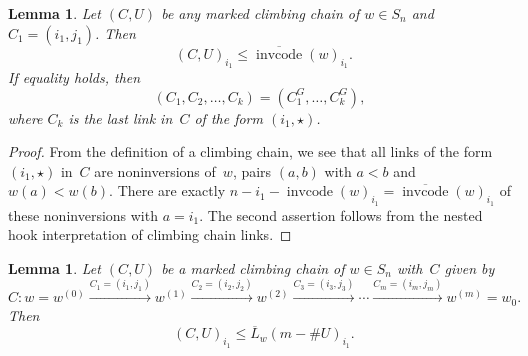 \documentclass[10pt,a4paper]{amsart}
\DeclareMathOperator{\dwt}{\overline{\mathrm{wt}}}
\DeclareMathOperator{\cc}{\mathrm{invcode}}
\newcommand{\occ}{\overline{\cc}}
\newcommand{\LL}{\overline{L}}
\newcommand{\CG}{C^G}
\newtheorem{lemma}[theorem]{Lemma}
\begin{document}
\setcounter{section}{11}\setcounter{theorem}{0}
\begin{lemma}
	\label{lem:maxmarkedones}
	Let $(C,U)$ be any marked climbing chain of $w\in S_n$ and $C_1=(i_1,j_1)$. Then 
	\[\dwt(C,U)_{i_1} \leq \occ(w)_{i_1}.\]
	If equality holds, then 
	\[(C_1,C_2,\ldots,C_k) = (\CG_1,\ldots,\CG_k), \]
	where $C_k$ is the last link in~$C$ of the form $(i_1,\star)$.
\end{lemma}

\begin{proof}
	From the definition of a climbing chain, we see that all links of the form $(i_1,\star)$ in~$C$ are noninversions of~$w$, pairs $(a,b)$ with $a<b$ and $w(a)<w(b)$. There are exactly $n-i_1-\cc(w)_{i_1} = \occ(w)_{i_1}$ of these noninversions with $a=i_1$. The second assertion follows from the nested hook interpretation of climbing chain links.
\end{proof}

\setcounter{section}{11}\setcounter{theorem}{1}
\begin{lemma}
	\label{lem:onemarkbasecase}
	Let $(C,U)$ be a marked climbing chain of $w\in S_n$ with~$C$ given by
	\[C: w=w^{(0)} \xrightarrow{C_1=(i_1,j_1)} w^{(1)} \xrightarrow{C_2=(i_2,j_2)} w^{(2)}\xrightarrow{C_3=(i_3,j_3)}\cdots\xrightarrow{C_m=(i_m,j_m)} w^{(m)} = w_0.\]
	Then
	\[\dwt(C,U)_{i_1} \leq \LL_w(m-\#U)_{i_1}. \]
\end{lemma}
\end{document}
